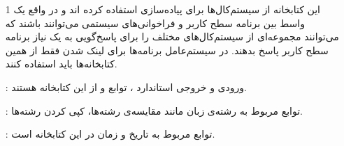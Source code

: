 \begin{itemize}
	\item [1] 
	این کتابخانه از سیستم‌کال‌ها برای پیاده‌سازی استفاده کرده‌ اند و در واقع یک واسط بین برنامه سطح کاربر و فراخوانی‌های سیستمی می‌توانند باشند که می‌توانند مجموعه‌ای از سیستم‌کال‌های مختلف را برای پاسخ‌گویی به یک نیاز برنامه سطح کاربر پاسخ بدهند. در 
	 سیستم‌عامل 
	 برنامه‌ها برای لینک شدن فقط از همین کتابخانه‌ها باید استفاده کنند.

\vspace{\baselineskip}

:
 ورودی و خروجی استاندارد 
 ، توابع 
  و 
   از این کتابخانه هستند.
\vspace{\baselineskip}

: توابع مربوط به رشته‌ی زبان 
 مانند مقایسه‌ی رشته‌ها، کپی کردن رشته‌ها.

: توابع مربوط به تاریخ و زمان در این کتابخانه است.

\end{itemize}